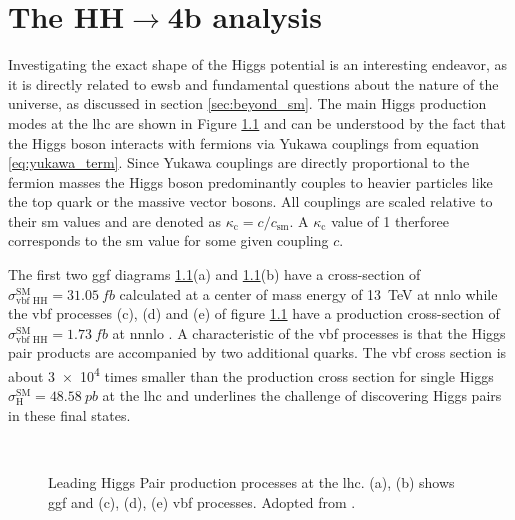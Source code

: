 \chapter{The HH$\rightarrow$4b analysis}\label{ch:hh4b}

Investigating the exact shape of the Higgs potential is an interesting endeavor, as it is directly related to \ac{ewsb} and fundamental questions about the nature of the universe, as discussed in section \ref{sec:beyond_sm}. The main Higgs production modes at the \ac{lhc} are shown in Figure \ref{fig:main_production_processes} and can be understood by the fact that the Higgs boson interacts with fermions via Yukawa couplings from equation \ref{eq:yukawa_term}. Since Yukawa couplings are directly proportional to the fermion masses the Higgs boson predominantly couples to heavier particles like the top quark or the massive vector bosons. All couplings are scaled relative to their \ac{sm} values and are denoted as $\kappa_\mathrm{c} = c/c_\mathrm{sm}$. A $\kappa_\mathrm{c}$ value of 1 therforee corresponds to the \ac{sm} value for some given coupling $c$.

The first two \ac{ggf} diagrams \ref{fig:main_production_processes}(a) and \ref{fig:main_production_processes}(b) have a cross-section of $\sigma_\text{vbf HH}^\text{SM}=\qty[]{31.05}{fb}$ calculated at a center of mass energy of \qty[]{13}{TeV} at \ac{nnlo} \citep{Grazzini_2018} while the \ac{vbf} processes (c), (d) and (e) of figure \ref{fig:main_production_processes} have a production cross-section of
$\sigma_\text{vbf HH}^\text{SM}=\qty[]{1.73}{fb}$ at \ac{nnnlo} \citep{PhysRevD.98.114016}. A characteristic of the \ac{vbf} processes is that the Higgs pair products are accompanied by two additional quarks. The \ac{vbf} cross section is about \qty[]{3e4}{} times smaller than the production cross section for single Higgs $\sigma_\text{H}^\text{SM}=\qty[]{48.58}{pb}$ at the \ac{lhc} \citep{de2016arxiv} and underlines the challenge of discovering Higgs pairs in these final states.
\begin{figure}
    \centering
    \hspace{.06\textwidth}
     \\
    \hspace{.01\textwidth}
    \hspace{.01\textwidth}
    \caption[]{Leading Higgs Pair production processes at the \ac{lhc}. (a), (b) shows \ac{ggf} and (c), (d), (e) \ac{vbf} processes. Adopted from \citep{aad2023search}.}
    \label{fig:main_production_processes}
\end{figure}

